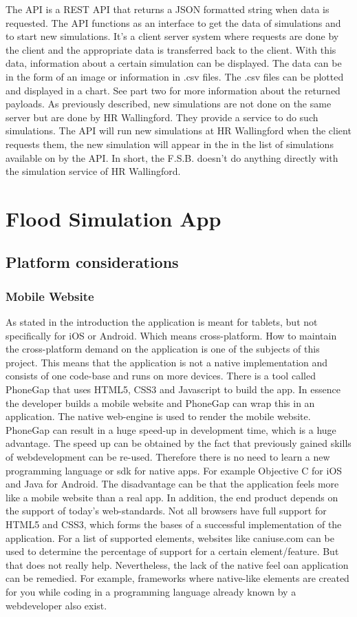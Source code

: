The API is a REST API \cite{REST} that returns a JSON \cite{JSON} formatted string when data is requested. The API functions as an interface to get the data of simulations and to start new simulations. It's a client server system where requests are done by the client and the appropriate data is transferred back to the client. With this data, information about a certain simulation can be displayed. The data can be in the form of an image or information in .csv \cite{CSV} files. The .csv files can be plotted and displayed in a chart. See part two for more information about the returned payloads.
As previously described, new simulations are not done on the same server but are done by HR Wallingford. They provide a service to do such simulations. The API will run new simulations at HR Wallingford when the client requests them, the new simulation will appear in the in the list of simulations available on by the API. In short, the F.S.B. doesn't do anything directly with the simulation service of HR Wallingford.

\section{Flood Simulation App}
\subsection{Platform considerations}
\subsubsection{Mobile Website}
As stated in the introduction the application is meant for tablets, but not specifically for iOS or Android. Which means cross-platform. How to maintain the cross-platform demand on the application is one of the subjects of this project. This means that the application is not a native implementation and consists of one code-base and runs on more devices. There is a tool called PhoneGap \cite{PhoneGap} that uses HTML5\cite{HTML5}, CSS3\cite{C3} and Javascript to build the app. In essence the developer builds a mobile website and PhoneGap can wrap this in an application. The native web-engine is used to render the mobile website. PhoneGap can result in a huge speed-up in development time, which is a huge advantage. The speed up can be obtained by the fact that previously gained skills of webdevelopment can be re-used. Therefore there is no need to learn a new programming language or sdk\cite{SDK} for native apps. For example Objective C for iOS and Java for Android. The disadvantage can be that the application feels more like a mobile website than a real app. In addition, the end product depends on the support of today's web-standards. Not all browsers have full support for HTML5 and CSS3, which forms the bases of a successful implementation of the application. For a list of supported elements, websites like caniuse.com \cite{CSS3} can be used to determine the percentage of support for a certain element/feature. But that does not really help. Nevertheless, the lack of the native feel oan application can be remedied. For example, frameworks where native-like elements are created for you while coding in a programming language already known by a webdeveloper also exist.


